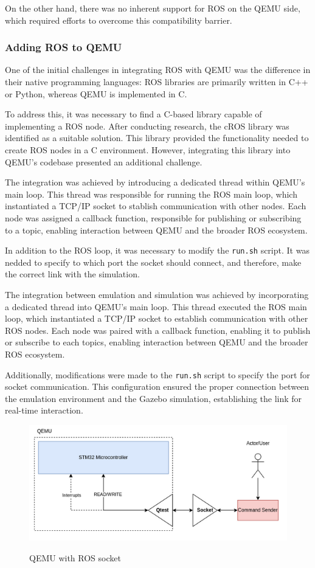 \documentclass[../../monografia.tex]{subfiles}
\begin{document}
On the other hand, there was no inherent support for ROS on the QEMU side, which required efforts to overcome this compatibility barrier.

\subsubsection{Adding ROS to QEMU}

One of the initial challenges in integrating ROS with QEMU was the difference in their native programming languages: ROS libraries are primarily written in C++ or Python, whereas QEMU is implemented in C.

To address this, it was necessary to find a C-based library capable of implementing a ROS node. After conducting research, the cROS library \cite{CROS_23} was identified as a suitable solution. This library provided the functionality needed to create ROS nodes in a C environment. However, integrating this library into QEMU's codebase presented an additional challenge.


The integration was achieved by introducing a dedicated thread within QEMU's main loop. This thread was responsible for running the ROS main loop, which instantiated a TCP/IP socket to stablish communication with other nodes. Each node was assigned a callback function, responsible for publishing or subscribing to a topic, enabling interaction between QEMU and the broader ROS ecosystem.

In addition to the ROS loop, it was necessary to modify the \texttt{run.sh} script. It was nedded to specify to which port the socket should connect, and therefore, make the correct link with the simulation.

The integration between emulation and simulation was achieved by incorporating a dedicated thread into QEMU's main loop. This thread executed the ROS main loop, which instantiated a TCP/IP socket to establish communication with other ROS nodes. Each node was paired with a callback function, enabling it to publish or subscribe to each topics, enabling interaction between QEMU and the broader ROS ecosystem.

Additionally, modifications were made to the \texttt{run.sh} script to specify the port for socket communication. This configuration ensured the proper connection between the emulation environment and the Gazebo simulation, establishing the link for real-time interaction.
\begin{figure}[h!]
    \caption{QEMU with ROS socket}
    \centering
    \includegraphics[width=16cm]{src/images/ros_socket.png}
    \label{fig: QEMU with ROS socket}
\end{figure}
\end{document}
